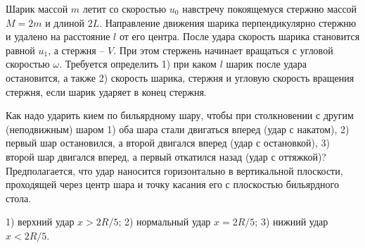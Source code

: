 \begin{ex}
Шарик массой $m$ летит со скоростью $u_0$ навстречу покоящемуся стержню массой $M = 2m$ и длиной $2L$. Направление движения шарика перпендикулярно стержню и удалено на расстояние $l$ от его центра. После удара скорость шарика становится равной $u_1$, а стержня -- $V$. При этом стержень начинает вращаться с угловой скоростью $\omega$. Требуется определить 1) при каком $l$ шарик после удара остановится, а также 2) скорость шарика, стержня и угловую скорость вращения стержня, если шарик ударяет в конец стержня.
\begin{ans}

\end{ans}
\end{ex}

\begin{ex}
Как надо ударить кием по бильярдному шару, чтобы при столкновении с другим (неподвижным) шаром 1) оба шара стали двигаться вперед (удар с накатом), 2) первый шар остановился, а второй двигался вперед (удар с остановкой), 3) второй шар двигался вперед, а первый откатился назад (удар с оттяжкой)? Предполагается, что удар наносится горизонтально в вертикальной плоскости, проходящей через центр шара и точку касания его с плоскостью бильярдного стола.
\begin{ans}
1) верхний удар $x > 2R/5$; 2) нормальный удар $x = 2R/5$; 3) нижний удар $x < 2R/5$.
\end{ans}
\end{ex}

